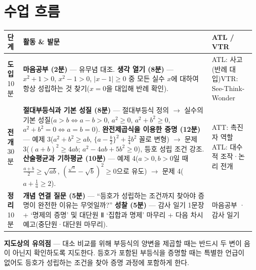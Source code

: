 \documentclass[11pt,a4paper]{article}
\begin{document}
\section{수업 흐름}
\begin{tabularx}{\linewidth}{@{}>{\centering\arraybackslash}p{1.6cm}X>{\raggedright\arraybackslash\small}p{3.1cm}@{}}
\toprule
\textbf{단계} & \textbf{활동 \& 발문} & \textbf{ATL / VTR} \\
\midrule
\textcolor{goldstrong}{\textbf{도입}}\newline\footnotesize 10분 &
\textbf{마음공부 (2분)} --- 유무념 대조.\newline
\textbf{생각 열기 (8분)} --- $x^2+1>0$, $x^2-1>0$, $|x-1|\ge0$ 중 모든 실수 $x$에 대하여 항상 성립하는 것 찾기($x=0$을 대입해 반례 확인). &
ATL: 사고(반례 대입)\newline VTR: See-Think-Wonder \\
\addlinespace
\textcolor{goldstrong}{\textbf{전개}}\newline\footnotesize 30분 &
\textbf{절대부등식과 기본 성질 (8분)} --- 절대부등식 정의 $\to$ 실수의 기본 성질($a>b \Leftrightarrow a-b>0$, $a^2\ge0$, $a^2+b^2\ge0$, $a^2+b^2=0 \Leftrightarrow a=b=0$).\newline
\textbf{완전제곱식을 이용한 증명 (12분)} --- 예제 3($a^2+b^2\ge ab$, $\{a-\frac b2\}^2+\frac34b^2$ 꼴로 변형) $\to$ 문제 3($(a+b)^2\ge4ab$; $a^2-4ab+5b^2\ge0$), 등호 성립 조건 강조.\newline
\textbf{산술평균과 기하평균 (10분)} --- 예제 4($a>0,b>0$일 때 $\frac{a+b}2\ge\sqrt{ab}$, $(\frac{\sqrt a}{}-\sqrt b)^2\ge0$으로 유도) $\to$ 문제 4($a+\frac1a\ge2$). &
ATT: 촉진자 역할\newline ATL: 대수적 조작·논리 전개 \\
\addlinespace
\textcolor{goldstrong}{\textbf{정리}}\newline\footnotesize 10분 &
\textbf{개념 연결 질문 (5분)} --- ``등호가 성립하는 조건까지 찾아야 증명이 완전한 이유는 무엇일까?''\newline
\textbf{성찰 (5분)} --- 감사 일기 1문장 + `명제의 증명' 및 대단원 Ⅱ `집합과 명제' 마무리 + 다음 차시 예고(중단원·대단원 마무리). &
마음공부 · 감사 일기 \\
\bottomrule
\end{tabularx}

\begin{calloutbox}
\textbf{지도상의 유의점} --- 대소 비교를 위해 부등식의 양변을 제곱할 때는 반드시 두 변이 음이 아닌지 확인하도록 지도한다. 등호가 포함된 부등식을 증명할 때는 특별한 언급이 없어도 등호가 성립하는 조건을 찾아 증명 과정에 포함하게 한다.
\end{calloutbox}
\end{document}

